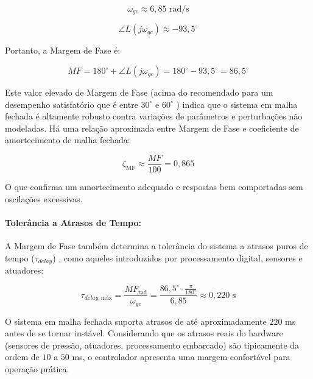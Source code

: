 \documentclass[12pt, a4paper]{article}
\begin{document}
					\begin{equation}
						\omega_{gc} \approx 6{,}85 \text{ rad/s}
					\end{equation}

					\begin{equation}
						\angle L(j\omega_{gc}) \approx -93{,}5^\circ
					\end{equation}

					Portanto, a Margem de Fase é:

					\begin{equation}
						MF = 180^\circ + \angle L(j\omega_{gc}) = 180^\circ - 93{,}5^\circ = 86{,}5^\circ
					\end{equation}

					Este valor elevado de Margem de Fase (acima do recomendado para um desempenho satisfatório que é entre $30^\circ$ e $60^\circ$ \cite{ogata}) indica que o sistema em malha fechada é altamente robusto contra variações de parâmetros e perturbações não modeladas. Há uma relação aproximada entre Margem de Fase e coeficiente de amortecimento de malha fechada:

					\begin{equation}
						\zeta_{\text{MF}} \approx \frac{MF}{100} = 0{,}865
					\end{equation}

					O que confirma um amortecimento adequado e respostas bem comportadas sem oscilações excessivas.

					\paragraph{Tolerância a Atrasos de Tempo:}

						A Margem de Fase também determina a tolerância do sistema a atrasos puros de tempo ($\tau_{delay}$) \cite{dorf}, como aqueles introduzidos por processamento digital, sensores e atuadores:

						\begin{equation}
							\tau_{delay,\text{máx}} = \frac{MF_{\text{rad}}}{\omega_{gc}} = \frac{86{,}5^\circ \cdot \frac{\pi}{180^\circ}}{6{,}85} \approx 0{,}220 \text{ s}
						\end{equation}

						O sistema em malha fechada suporta atrasos de até aproximadamente $220$ ms antes de se tornar instável. Considerando que os atrasos reais do hardware (sensores de pressão, atuadores, processamento embarcado) são tipicamente da ordem de $10$ a $50$ ms, o controlador apresenta uma margem confortável para operação prática.
\end{document}
